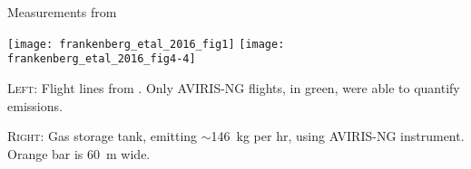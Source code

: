 \caption{Measurements from \textcite{Frankenberg/etal:2016}}
\label{fig:frankenberg-measurement-figs}

\texttt{[image: frankenberg\_etal\_2016\_fig1]}
\texttt{[image: frankenberg\_etal\_2016\_fig4-4]}

\textsc{Left:}
Flight lines from \textcite{Frankenberg/etal:2016}.
Only \gls{AVIRIS-NG} flights, in green, were able to quantify emissions.

\textsc{Right:}
Gas storage tank, emitting \(\sim\)146~kg  per hr, using \gls{AVIRIS-NG} instrument.
Orange bar is 60~m wide.
